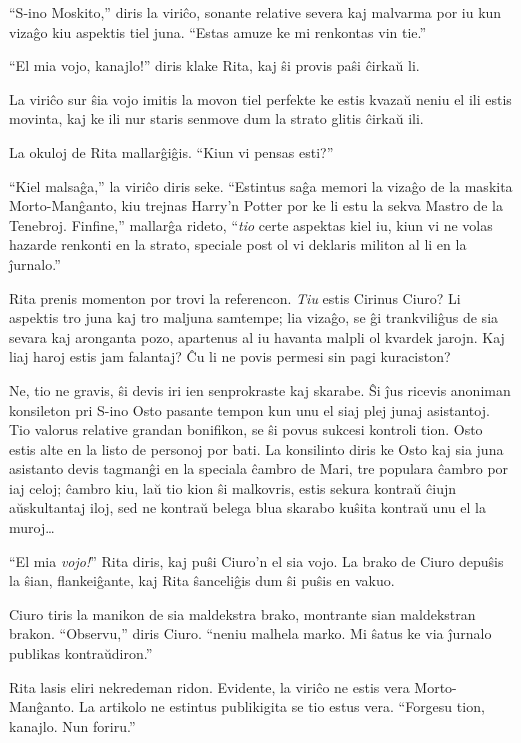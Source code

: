 ``S-ino Moskito,'' diris la viriĉo, sonante relative severa kaj
malvarma por iu kun vizaĝo kiu aspektis tiel juna. ``Estas amuze ke mi
renkontas vin tie.''

``El mia vojo, kanajlo!'' diris klake Rita, kaj ŝi provis paŝi ĉirkaŭ li.

La viriĉo sur ŝia vojo imitis la movon tiel perfekte ke estis kvazaŭ
neniu el ili estis movinta, kaj ke ili nur staris senmove dum la
strato glitis ĉirkaŭ ili.

La okuloj de Rita mallarĝiĝis. ``Kiun vi pensas esti?''

``Kiel malsaĝa,'' la viriĉo diris seke. ``Estintus saĝa memori la
vizaĝo de la maskita Morto-Manĝanto, kiu trejnas Harry'n Potter por ke
li estu la sekva Mastro de la Tenebroj. Finfine,'' mallarĝa rideto,
``\emph{tio} certe aspektas kiel iu, kiun vi ne volas hazarde renkonti
en la strato, speciale post ol vi deklaris militon al li en la
ĵurnalo.''

Rita prenis momenton por trovi la referencon. \emph{Tiu} estis Cirinus
Ciuro? Li aspektis tro juna kaj tro maljuna samtempe; lia vizaĝo, se
ĝi trankviliĝus de sia sevara kaj aronganta pozo, apartenus al iu
havanta malpli ol kvardek jarojn. Kaj liaj haroj estis jam falantaj? Ĉu
li ne povis permesi sin pagi kuraciston?

Ne, tio ne gravis, ŝi devis iri ien senprokraste kaj skarabe. Ŝi ĵus
ricevis anoniman konsileton pri S-ino Osto pasante tempon kun unu el
siaj plej junaj asistantoj. Tio valorus relative grandan bonifikon, se
ŝi povus sukcesi kontroli tion. Osto estis alte en la listo de
personoj por bati. La konsilinto diris ke Osto kaj sia juna asistanto
devis tagmanĝi en la speciala ĉambro de Mari, tre populara ĉambro por
iaj celoj; ĉambro kiu, laŭ tio kion ŝi malkovris, estis sekura kontraŭ
ĉiujn aŭskultantaj iloj, sed ne kontraŭ belega blua skarabo kuŝita
kontraŭ unu el la muroj\ldots{}

``El mia \emph{vojo!}'' Rita diris, kaj puŝi Ciuro'n el sia vojo. La
brako de Ciuro depuŝis la ŝian, flankeiĝante, kaj Rita ŝanceliĝis dum
ŝi puŝis en vakuo.

Ciuro tiris la manikon de sia maldekstra brako, montrante sian
maldekstran brakon. ``Observu,'' diris Ciuro. ``neniu malhela
marko. Mi ŝatus ke via ĵurnalo publikas kontraŭdiron.''

Rita lasis eliri nekredeman ridon. Evidente, la viriĉo ne estis vera
Morto-Manĝanto. La artikolo ne estintus publikigita se tio estus
vera. ``Forgesu tion, kanajlo. Nun foriru.''

